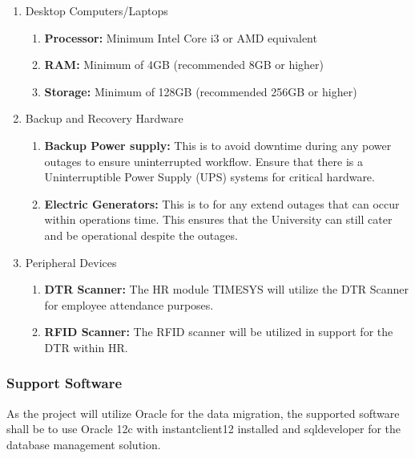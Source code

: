         \begin{enumerate}
            \item Desktop Computers/Laptops
            \begin{enumerate}
                \item \textbf{Processor:} Minimum Intel Core i3 or AMD equivalent
                \item \textbf{RAM:} Minimum of 4GB (recommended 8GB or higher)
                \item \textbf{Storage:} Minimum of 128GB (recommended 256GB or higher)
            \end{enumerate}
            
            \item Backup and Recovery Hardware
            \begin{enumerate}
                \item \textbf{Backup Power supply:} This is to avoid downtime during any power outages to ensure uninterrupted workflow. Ensure that there is a Uninterruptible Power Supply (UPS) systems for critical hardware.
                
                \item \textbf{Electric Generators:} This is to for any extend outages that can occur within operations time. This ensures that the University can still cater and be operational despite the outages.
            \end{enumerate}
            
            \item Peripheral Devices
            \begin{enumerate}
                \item \textbf{DTR Scanner:} The HR module TIMESYS will utilize the DTR Scanner for employee attendance purposes.
                \item \textbf{RFID Scanner:} The RFID scanner will be utilized in support for the DTR within HR.
            \end{enumerate}
            
        \end{enumerate}

        \subsubsection{Support Software}

        As the project will utilize Oracle for the data migration, the supported software shall be to use Oracle 12c with instantclient12 installed and sqldeveloper for the database management solution. 

